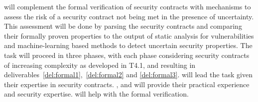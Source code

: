 \begin{Workpackage}{\thewpno}
\begin{Task}
\theTask{} will complement the formal verification of security contracts with mechanisms to assess the risk of a security contract not being met in the presence of uncertainty. 
This assessment will be done by parsing the security contracts and comparing their formally proven properties to the output of static analysis for vulnerabilities and machine-learning based methods to detect uncertain security properties. The task will proceed in three phases, with each phase considering security contracts of increasing complexity as developed in T4.1, and resulting in deliverables~\ref{del:formal1},~\ref{del:formal2} and \ref{del:formal3}. \UCM will lead the task given their expertise in security contracts.  \IBMshort, \YAGshort and \SOPRAshort will provide their practical experience and security expertise. \SA will help with the formal verification.
\end{Task}


\begin{Task}

\TaskResults{%
\ref{del:formal1},
\ref{del:formal2},
\ref{del:formal3}
}
\TaskHeader{}



\end{Task}
\end{Workpackage}
